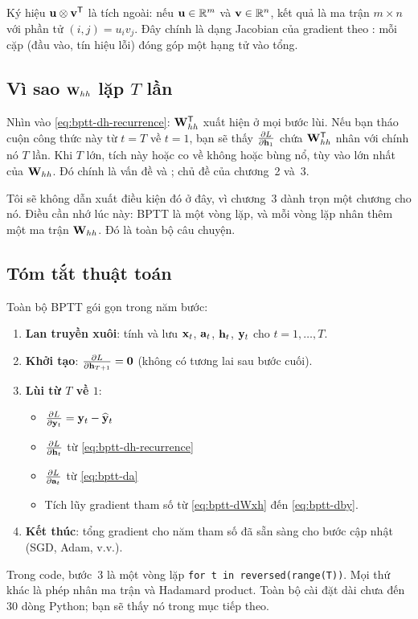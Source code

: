 Ký hiệu $\mathbf{u} \otimes \mathbf{v}^{\mathsf{T}}$ là tích ngoài: nếu $\mathbf{u}
\in \mathbb{R}^m$ và $\mathbf{v} \in \mathbb{R}^n$, kết quả là ma trận $m \times n$ với phần
tử $(i,j) = u_i v_j$. Đây chính là dạng Jacobian của gradient theo
: mỗi cặp (đầu vào, tín hiệu lỗi) đóng góp
một hạng tử vào tổng.

\subsection{Vì sao $\mathbf{W}_{hh}$ lặp $T$ lần}

Nhìn vào \eqref{eq:bptt-dh-recurrence}: $\mathbf{W}_{hh}^{\mathsf{T}}$ xuất hiện ở
mọi bước lùi. Nếu bạn tháo cuộn công thức này từ $t = T$ về $t = 1$, bạn sẽ
thấy $\frac{\partial L}{\partial \mathbf{h}_1}$ chứa $\mathbf{W}_{hh}^{\mathsf{T}}$ nhân với chính nó $T$
lần. Khi $T$ lớn, tích này hoặc co về không hoặc bùng nổ, tùy vào
 lớn nhất của $\mathbf{W}_{hh}$. Đó chính là vấn đề
 và
; chủ đề của chương~2 và~3.

Tôi sẽ không dẫn xuất điều kiện đó ở đây, vì chương~3 dành trọn một chương
cho nó. Điều cần nhớ lúc này: BPTT là một vòng lặp, và mỗi vòng lặp nhân thêm
một ma trận $\mathbf{W}_{hh}$. Đó là toàn bộ câu chuyện.

\subsection{Tóm tắt thuật toán}

Toàn bộ BPTT gói gọn trong năm bước:

\begin{enumerate}
  \item \textbf{Lan truyền xuôi}: tính và lưu $\mathbf{x}_t$, $\mathbf{a}_t$,
    $\mathbf{h}_t$, $\mathbf{y}_t$ cho $t = 1, \dots, T$.
  \item \textbf{Khởi tạo}: $\frac{\partial L}{\partial \mathbf{h}_{T+1}} = \mathbf{0}$ (không có
    tương lai sau bước cuối).
  \item \textbf{Lùi từ $T$ về $1$}:
    \begin{itemize}
      \item $\frac{\partial L}{\partial \mathbf{y}_t} = \mathbf{y}_t - \widehat{\mathbf{y}}_t$
      \item $\frac{\partial L}{\partial \mathbf{h}_t}$ từ \eqref{eq:bptt-dh-recurrence}
      \item $\frac{\partial L}{\partial \mathbf{a}_t}$ từ \eqref{eq:bptt-da}
      \item Tích lũy gradient tham số từ
        \eqref{eq:bptt-dWxh} đến \eqref{eq:bptt-dby}.
    \end{itemize}
  \item \textbf{Kết thúc}: tổng gradient cho năm tham số đã sẵn sàng cho
    bước cập nhật (SGD, Adam, v.v.).
\end{enumerate}

Trong code, bước~3 là một vòng lặp \texttt{for t in reversed(range(T))}.
Mọi thứ khác là phép nhân ma trận và Hadamard product. Toàn bộ cài đặt dài
chưa đến 30 dòng Python; bạn sẽ thấy nó trong mục tiếp theo.
